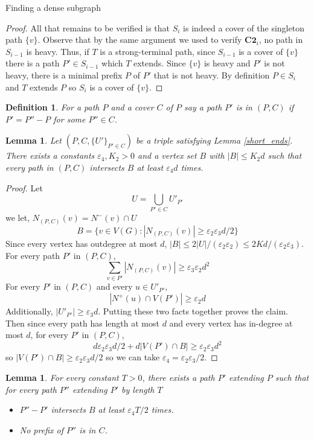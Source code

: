 \documentclass[11pt,a4paper]{article}
\newcounter{foo}
\newtheorem{lemma}[subsection]{Lemma}
\newtheorem{definition}[foo]{Definition}
\newcommand{\vep}{\varepsilon}
\begin{document}
\begin{section}{Finding a dense subgraph}
\begin{proof}
All that remains to be verified is that $S_i$ is indeed a cover of the singleton path $\{v\}$. Observe that by the same argument we used to verify $\textbf{C2}_i$, no path in $S_{i - 1}$ is heavy. Thus, if $T$ is a strong-terminal path, since $S_{i - 1}$ is a cover of $\{v\}$ there is a path $P' \in S_{i - 1}$ which $T$ extends. Since $\{v\}$ is heavy and $P'$ is not heavy, there is a minimal prefix $P$ of $P'$ that is not heavy. By definition $P \in S_i$ and $T$ extends $P$ so $S_i$ is a cover of $\{v\}$.
\end{proof}
\begin{definition} For a path $P$ and a cover $C$ of $P$ say a path $P'$ is in $(P, C)$ if $P' = P'' - P$ for some $P'' \in C$.
\end{definition}
\begin{lemma} \label{heavy_intersecter} Let $(P, C, \{U'\}_{P' \in C})$ be a triple satisfying Lemma \ref{short_ends}. There exists a constants $\vep_4, K_2 > 0$ and a vertex set $B$ with $|B| \leq K_2 d$ such that every path in $(P, C)$ intersects $B$ at least $\vep_4 d$ times.
\end{lemma}
\begin{proof} Let
\[
U = \bigcup_{P' \in C} U'_{P'}
\]
we let, $N_{(P, C)}(v) = N^{-}(v) \cap U$
\[
B = \{v \in V(G) : | N_{(P, C)}(v) | \geq \vep_2 \vep_3 d/2 \}
\]
Since every vertex has outdegree at most $d$, $|B| \leq 2 |U|/(\vep_2 \vep_2) \leq 2K d/(\vep_2 \vep_3) $.
\claim For every path $P'$ in $(P, C)$,
\[
\sum_{v \in P'} | N_{(P, C)} (v) | \geq \vep_3 \vep_2 d^2
\]
\proof For every $P'$ in $(P, C)$ and every $u \in U'_{P'}$,
\[
|N^{+}(u) \cap V(P')| \geq \vep_2 d
\]
Additionally, $|U'_{P'}| \geq \vep_3 d$. Putting these two facts together proves the claim.
Then since every path has length at most $d$ and every vertex has in-degree at most $d$, for every $P'$ in $(P, C)$,
\[
d \vep_2 \vep_3 d /2 + d |V(P') \cap B| \geq \vep_2 \vep_3 d^2
\]
so $|V(P') \cap B| \geq \vep_2 \vep_3 d/2 $ so we can take $\vep_4 = \vep_2 \vep_3/2$.
\end{proof}
\begin{lemma} For every constant $T > 0$, there exists a path $P'$ extending $P$ such that for every path $P''$ extending $P'$ by length $T$
\begin{itemize}
\item $P'' - P'$ intersects $B$ at least $\vep_4 T/2 $ times.
\item No prefix of $P''$ is in $C$.
\end{itemize}
\end{lemma}

\end{section}
\end{document}
